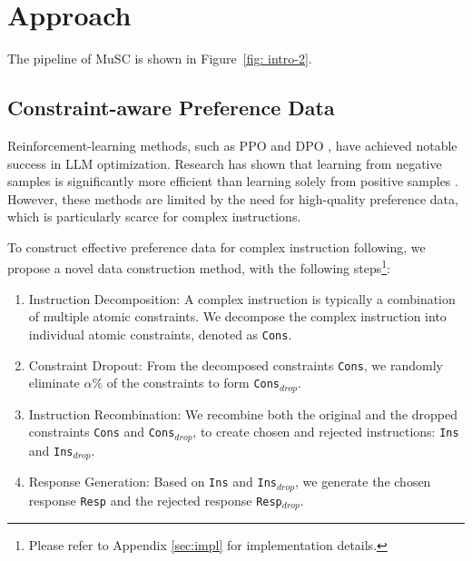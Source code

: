 \section{Approach}
The pipeline of MuSC is shown in Figure~\ref{fig: intro-2}.
\subsection{Constraint-aware Preference Data}

Reinforcement-learning methods, such as PPO \cite{schulman2017proximalpolicyoptimizationalgorithms} and DPO \cite{rafailov2024directpreferenceoptimizationlanguage}, have achieved notable success in LLM optimization. Research has shown that learning from negative samples is significantly more efficient than learning solely from positive samples \cite{yang2024doesnegativesamplingmatter}. However, these methods are limited by the need for high-quality preference data, which is particularly scarce for complex instructions.


To construct effective preference data for complex instruction following, we propose a novel data construction method, with the following steps\footnote{Please refer to Appendix \ref{sec:impl} for implementation details.}:

\vspace{-2mm}

\begin{enumerate}[itemsep=1mm, parsep=0pt]
    \item Instruction Decomposition: A complex instruction is typically a combination of multiple atomic constraints. We decompose the complex instruction into individual atomic constraints, denoted as \texttt{Cons}.
    \item Constraint Dropout: From the decomposed constraints \texttt{Cons}, we randomly eliminate $\alpha\%$ of the constraints to form \texttt{Cons$_{drop}$}.
    \item Instruction Recombination: We recombine both the original and the dropped constraints \texttt{Cons} and \texttt{Cons$_{drop}$}, to create chosen and rejected instructions: \texttt{Ins} and \texttt{Ins$_{drop}$}.
    \item Response Generation: Based on \texttt{Ins} and \texttt{Ins$_{drop}$}, we generate the chosen response \texttt{Resp} and the rejected response \texttt{Resp$_{drop}$}.
\end{enumerate}

